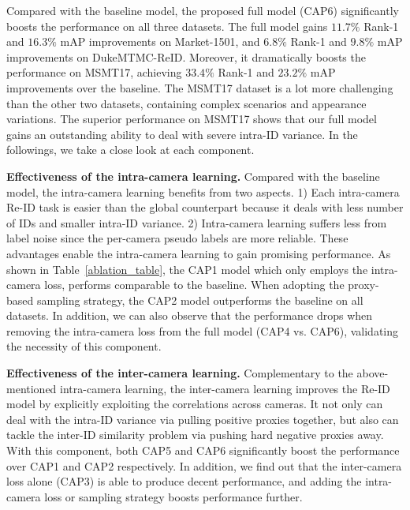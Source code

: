 \documentclass[letterpaper]{article} %
\begin{document}
Compared with the baseline model, the proposed full model (CAP6) significantly boosts the performance on all three datasets. The full model gains $11.7\%$ Rank-1 and $16.3\%$ mAP improvements on Market-1501, and $6.8\%$ Rank-1 and $9.8\%$ mAP improvements on DukeMTMC-ReID. Moreover, it dramatically boosts the performance on MSMT17, achieving $33.4\%$ Rank-1 and $23.2\%$ mAP improvements over the baseline. The MSMT17 dataset is a lot more challenging than the other two datasets, containing complex scenarios and appearance variations. The superior performance on MSMT17 shows that our full model gains an outstanding ability to deal with severe intra-ID variance. In the followings, we take a close look at each component.



\textbf{Effectiveness of the intra-camera learning.}
Compared with the baseline model, the intra-camera learning benefits from two aspects. 1) Each intra-camera Re-ID task is easier than the global counterpart because it deals with less number of IDs and smaller intra-ID variance. 2) Intra-camera learning suffers less from label noise since the per-camera pseudo labels are more reliable. These advantages enable the intra-camera learning to gain promising performance. As shown in Table~\ref{ablation_table}, the CAP1 model which only employs the intra-camera loss, performs comparable to the baseline. When adopting the proxy-based sampling strategy, the CAP2 model outperforms the baseline on all datasets. In addition, we can also observe that the performance drops when removing the intra-camera loss from the full model (CAP4 vs. CAP6), validating the necessity of this component.



\textbf{Effectiveness of the inter-camera learning.} Complementary to the above-mentioned intra-camera learning, the inter-camera learning improves the Re-ID model by explicitly exploiting the correlations across cameras. It not only can deal with the intra-ID variance via pulling positive proxies together, but also can tackle the inter-ID similarity problem via pushing hard negative proxies away.
With this component, both CAP5 and CAP6 significantly boost the performance over CAP1 and CAP2 respectively. In addition, we find out that the inter-camera loss alone (CAP3) is able to produce decent performance, and adding the intra-camera loss or sampling strategy boosts performance further.
\end{document}
